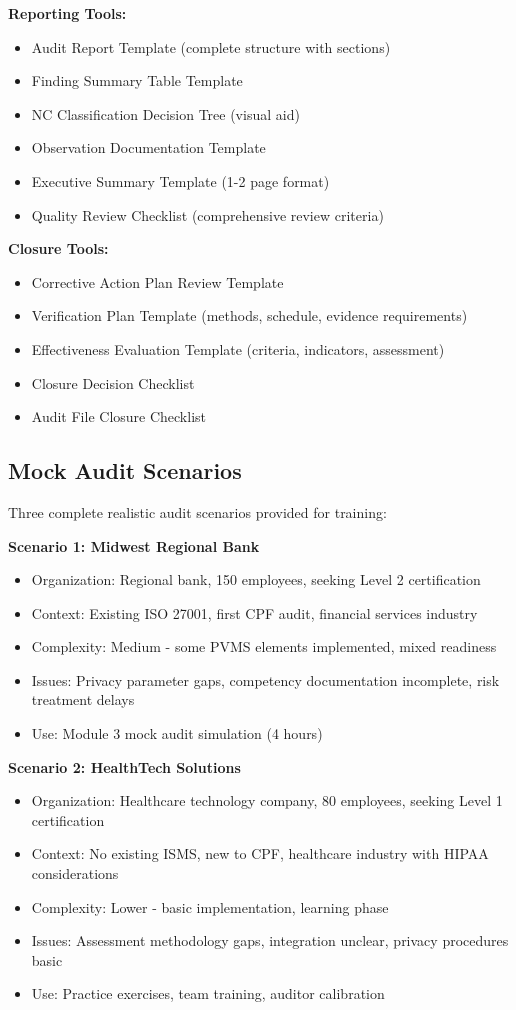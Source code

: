 \documentclass[11pt,a4paper]{article}
\begin{document}
\textbf{Reporting Tools:}
\begin{itemize}
\item Audit Report Template (complete structure with sections)
\item Finding Summary Table Template
\item NC Classification Decision Tree (visual aid)
\item Observation Documentation Template
\item Executive Summary Template (1-2 page format)
\item Quality Review Checklist (comprehensive review criteria)
\end{itemize}

\textbf{Closure Tools:}
\begin{itemize}
\item Corrective Action Plan Review Template
\item Verification Plan Template (methods, schedule, evidence requirements)
\item Effectiveness Evaluation Template (criteria, indicators, assessment)
\item Closure Decision Checklist
\item Audit File Closure Checklist
\end{itemize}

\subsection{Mock Audit Scenarios}

Three complete realistic audit scenarios provided for training:

\textbf{Scenario 1: Midwest Regional Bank}
\begin{itemize}
\item Organization: Regional bank, 150 employees, seeking Level 2 certification
\item Context: Existing ISO 27001, first CPF audit, financial services industry
\item Complexity: Medium - some PVMS elements implemented, mixed readiness
\item Issues: Privacy parameter gaps, competency documentation incomplete, risk treatment delays
\item Use: Module 3 mock audit simulation (4 hours)
\end{itemize}

\textbf{Scenario 2: HealthTech Solutions}
\begin{itemize}
\item Organization: Healthcare technology company, 80 employees, seeking Level 1 certification
\item Context: No existing ISMS, new to CPF, healthcare industry with HIPAA considerations
\item Complexity: Lower - basic implementation, learning phase
\item Issues: Assessment methodology gaps, integration unclear, privacy procedures basic
\item Use: Practice exercises, team training, auditor calibration
\end{itemize}
\end{document}
